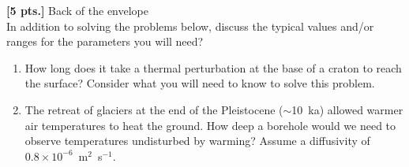 \item \label{itm:bote} {\bf [5 pts.]} Back of the envelope \\
In addition to solving the problems below, discuss the typical values and/or
ranges for the parameters you will need?
\begin{enumerate}
    \item How long does it take a thermal perturbation at the base of a
    craton to reach the surface?  Consider what you will need to know to
    solve this problem.  

    \item The retreat of glaciers at the end of the Pleistocene
    ($\sim$10~ka) allowed warmer air temperatures to heat the ground.  How
    deep a borehole would we need to observe temperatures undisturbed by
    warming? Assume a diffusivity of $0.8 \times 10^{-6}$~m$^2$~s$^{-1}$.
\end{enumerate}
